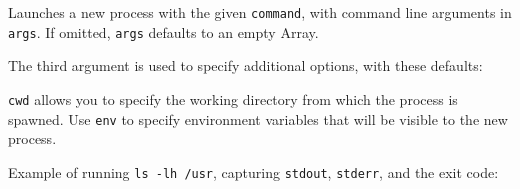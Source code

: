 Launches a new process with the given \texttt{command}, with command
line arguments in \texttt{args}. If omitted, \texttt{args} defaults to
an empty Array.

The third argument is used to specify additional options, with these
defaults:

\begin{Shaded}
\begin{Highlighting}[]
\NormalTok{\{ }\NormalTok{: }\NormalTok{,}
  \NormalTok{: }
\NormalTok{\}}
\end{Highlighting}
\end{Shaded}

\texttt{cwd} allows you to specify the working directory from which the
process is spawned. Use \texttt{env} to specify environment variables
that will be visible to the new process.

Example of running \texttt{ls -lh /usr}, capturing \texttt{stdout},
\texttt{stderr}, and the exit code:

\begin{Shaded}
\begin{Highlighting}[]
 \NormalTok{(}\NormalTok{,}
    \NormalTok{(}\NormalTok{, [}\NormalTok{, }\NormalTok{]);}

\NormalTok{(}\NormalTok{, } 
  \NormalTok{(} 
\NormalTok{\});}

\NormalTok{(}\NormalTok{, } 
  \NormalTok{(} 
\NormalTok{\});}

\NormalTok{(}\NormalTok{, } 
  \NormalTok{(} 
\NormalTok{\});}
\end{Highlighting}
\end{Shaded}

